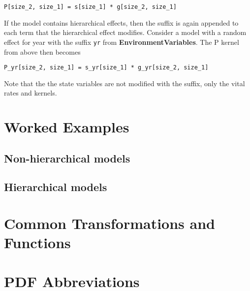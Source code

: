\documentclass[]{article}
\begin{document}
\texttt{P{[}size\_2,\ size\_1{]}\ =\ s{[}size\_1{]}\ *\ g{[}size\_2,\ size\_1{]}}

If the model contains hierarchical effects, then the suffix is again
appended to each term that the hierarchical effect modifies. Consider a
model with a random effect for year with the suffix \texttt{yr} from
\textbf{EnvironmentVariables}. The P kernel from above then becomes

\texttt{P\_yr{[}size\_2,\ size\_1{]}\ =\ s\_yr{[}size\_1{]}\ *\ g\_yr{[}size\_2,\ size\_1{]}}

Note that the the state variables are not modified with the suffix, only
the vital rates and kernels.

\hypertarget{examples}{\section{Worked Examples}\label{examples}}

\subsection{Non-hierarchical models}\label{non-hierarchical-models}

\subsection{Hierarchical models}\label{hierarchical-models}

\hypertarget{transforms-funs}{\section{Common Transformations and
Functions}\label{transforms-funs}}

\section{PDF Abbreviations}\label{pdf-abbrevs}
\end{document}
